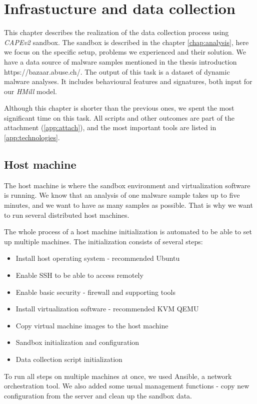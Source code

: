 \chapter{Infrastucture and data collection} \label{chap:infrastructure}
This chapter describes the realization of the data collection process using \emph{CAPEv2} sandbox. The sandbox is described in the chapter \ref{chap:analysis}, here we focus on the specific setup, problems we experienced and their solution. We have a data source of malware samples mentioned in the thesis introduction https://bazaar.abuse.ch/. The output of this task is a dataset of dynamic malware analyses. It includes behavioural features and signatures, both input for our \emph{HMill} model.

Although this chapter is shorter than the previous ones, we spent the most significant time on this task. All scripts and other outcomes are part of the attachment (\ref{app:attach}), and the most important tools are listed in \ref{app:technologies}.

\section{Host machine}
The host machine is where the sandbox environment and virtualization software is running. We know that an analysis of one malware sample takes up to five minutes, and we want to have as many samples as possible. That is why we want to run several distributed host machines. 

The whole process of a host machine initialization is automated to be able to set up multiple machines. The initialization consists of several steps:
\begin{itemize}
    \itemsep0em 
    \item Install host operating system - recommended Ubuntu
    \item Enable SSH to be able to access remotely
    \item Enable basic security - firewall and supporting tools
    \item Install virtualization software - recommended KVM QEMU
    \item Copy virtual machine images to the host machine
    \item Sandbox initialization and configuration
    \item Data collection script initialization
\end{itemize}

To run all steps on multiple machines at once, we used Ansible, a network orchestration tool. We also added some usual management functions - copy new configuration from the server and clean up the sandbox data.

